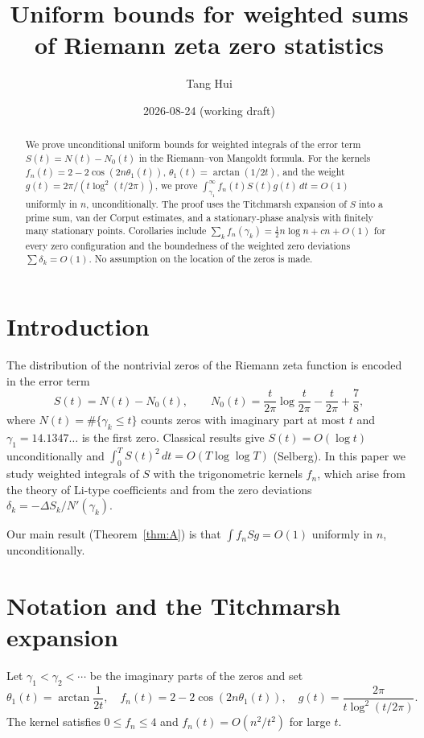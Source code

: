 \documentclass[11pt]{article}
\title{Uniform bounds for weighted sums of Riemann zeta zero statistics}
\author{Tang Hui}
\date{2026-08-24 (working draft)}
\begin{document}
\maketitle

\begin{abstract}
We prove unconditional uniform bounds for weighted integrals of the error term
$S(t)=N(t)-N_0(t)$ in the Riemann--von Mangoldt formula. For the kernels
$f_n(t)=2-2\cos(2n\theta_1(t))$, $\theta_1(t)=\arctan(1/2t)$, and the weight
$g(t)=2\pi/(t\log^2(t/2\pi))$, we prove
$\int_{\gamma_1}^{\infty} f_n(t)S(t)g(t)\,dt=O(1)$ uniformly in $n$,
unconditionally. The proof uses the Titchmarsh expansion of $S$ into a prime
sum, van der Corput estimates, and a stationary-phase analysis with finitely
many stationary points. Corollaries include
$\sum_k f_n(\gamma_k)=\tfrac12 n\log n+cn+O(1)$ for every zero configuration
and the boundedness of the weighted zero deviations $\sum\delta_k=O(1)$.
No assumption on the location of the zeros is made.
\end{abstract}

\section{Introduction}
The distribution of the nontrivial zeros of the Riemann zeta function is
encoded in the error term
\[
S(t)=N(t)-N_0(t),\qquad
N_0(t)=\frac{t}{2\pi}\log\frac{t}{2\pi}-\frac{t}{2\pi}+\frac78,
\]
where $N(t)=\#\{\gamma_k\le t\}$ counts zeros with imaginary part at most $t$
and $\gamma_1=14.1347\ldots$ is the first zero. Classical results give
$S(t)=O(\log t)$ unconditionally and
$\int_0^T S(t)^2\,dt=O(T\log\log T)$ (Selberg). In this paper we study
weighted integrals of $S$ with the trigonometric kernels $f_n$, which arise
from the theory of Li-type coefficients and from the zero deviations
$\delta_k=-\Delta S_k/N'(\gamma_k)$.

Our main result (Theorem~\ref{thm:A}) is that
$\int f_n S g=O(1)$ uniformly in $n$, unconditionally.

\section{Notation and the Titchmarsh expansion}
Let $\gamma_1<\gamma_2<\cdots$ be the imaginary parts of the zeros and set
\[
\theta_1(t)=\arctan\frac1{2t},\quad
f_n(t)=2-2\cos(2n\theta_1(t)),\quad
g(t)=\frac{2\pi}{t\log^2(t/2\pi)}.
\]
The kernel satisfies $0\le f_n\le 4$ and $f_n(t)=O(n^2/t^2)$ for large $t$.
\end{document}

